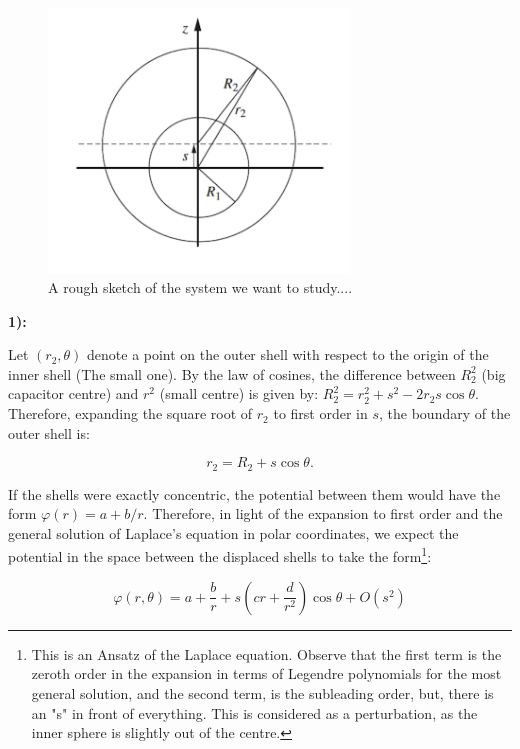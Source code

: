 \begin{figure}[h]
	\includegraphics[width=8cm]{figures/capacitoroff.png}
	\centering
	\caption{A rough sketch of the system we want to study....}
\end{figure}

\textbf{1):}

Let $\left(r_{2}, \theta\right)$ denote a point on the outer shell with respect to the origin of the inner shell (The small one). By the law of cosines, the difference between $R_{2}^{2}$ (big capacitor centre) and $r^{2}$ (small centre) is given by: $R_{2}^{2}=r_{2}^{2}+s^{2}-2 r_{2} s \cos \theta$. Therefore, expanding the square root of $r_{2}$ to first order in $s$, the boundary of the outer shell is:
	
\begin{equation}
	r_{2}=R_{2}+s \cos \theta.
\end{equation}

If the shells were exactly concentric, the potential between them would have the form $\varphi(r)=a+b / r$. Therefore, in light of the expansion to first order and the general solution of Laplace's equation in polar coordinates, we expect the potential in the space between the displaced shells to take the form\footnote{This is an Ansatz of the Laplace equation. Observe that the first term is the zeroth order in the expansion in terms of Legendre polynomials for the most general solution, and the second term, is the subleading order, but, there is an "s" in front of everything. This is considered as a perturbation, as the inner sphere is slightly out of the centre.}:

\begin{equation}\label{potentialexpression}
	\varphi(r, \theta)=a+\frac{b}{r}+s\left(c r+\frac{d}{r^{2}}\right) \cos \theta+O\left(s^{2}\right)
\end{equation}

